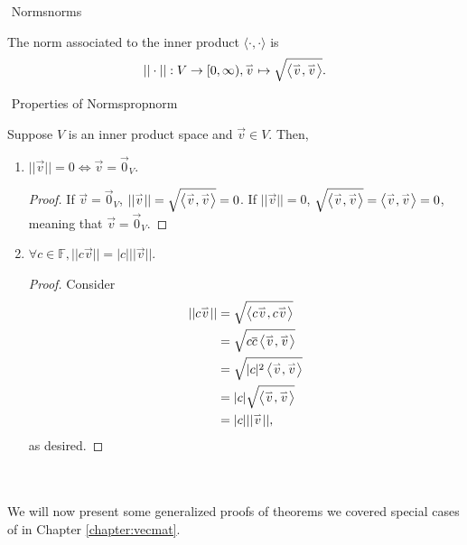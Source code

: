         \begin{definition}{\Stop\,\,Norms}{norms}

            The norm associated to the inner product \(\langle\cdot,\cdot\rangle\) is
            \begin{equation*}
                ||\cdot||:V\to[0,\infty),\overset{_{\rightharpoonup}}{v}\mapsto\sqrt{\left\langle \overset{_{\rightharpoonup}}{v},\overset{_{\rightharpoonup}}{v}\right\rangle}.
            \end{equation*}
            
        \end{definition}
        \pagebreak
        \begin{theorem}{\Stop\,\,Properties of Norms}{propnorm}

            Suppose \(V\) is an inner product space and \(\vec{v}\in V\). Then,
            \begin{enumerate}
                \item \(||\vec{v}||=0\iff\vec{v}=\vec{0}_V\).
                \begin{proof}
                    If \(\vec{v}=\vec{0}_V\), \(||\overset{_{\rightharpoonup}}{v}||=\sqrt{\left\langle \overset{_{\rightharpoonup}}{v},\overset{_{\rightharpoonup}}{v}\right\rangle}=0\). If \(||\vec{v}||=0\), \(\sqrt{\left\langle \overset{_{\rightharpoonup}}{v},\overset{_{\rightharpoonup}}{v}\right\rangle}=\left\langle \overset{_{\rightharpoonup}}{v},\overset{_{\rightharpoonup}}{v}\right\rangle=0\), meaning that \(\vec{v}=\vec{0}_V\).
                \end{proof}
                \item \(\forall c\in\mathbb{F},||c\vec{v}||=|c|||\vec{v}||\).
                \begin{proof}
                    Consider
                    \begin{align*}
                        ||c\overset{_{\rightharpoonup}}{v}||&=\sqrt{\left\langle c\overset{_{\rightharpoonup}}{v},c\overset{_{\rightharpoonup}}{v}\right\rangle} \\
                        &=\sqrt{c\overline{c}\left\langle \overset{_{\rightharpoonup}}{v},\overset{_{\rightharpoonup}}{v}\right\rangle} \\
                        &=\sqrt{|c|^2\left\langle \overset{_{\rightharpoonup}}{v},\overset{_{\rightharpoonup}}{v}\right\rangle} \\
                        &=|c|\sqrt{\left\langle \overset{_{\rightharpoonup}}{v},\overset{_{\rightharpoonup}}{v}\right\rangle} \\
                        &=|c|||\overset{_{\rightharpoonup}}{v}||,
                    \end{align*}
                    as desired.
                \end{proof}
            \end{enumerate}
            
        \end{theorem}
        \vphantom
        \\
        \\
        We will now present some generalized proofs of theorems we covered special cases of in Chapter \ref{chapter:vecmat}. 
